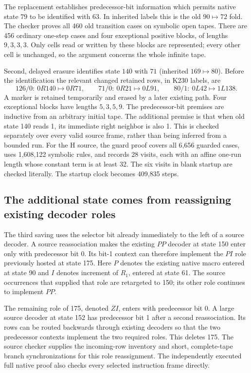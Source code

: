 The replacement establishes predecessor-bit information which permits native
state $79$ to be identified with $63$.  In inherited labels this is the old
$90\mapsto72$ fold.  The checker proves all 460 old transition cases on symbolic
open tapes.  There are 456 ordinary one-step cases and four exceptional positive
blocks, of lengths $9,3,3,3$.  Only cells read or written by these blocks are
represented; every other cell is unchanged, so the argument concerns the whole
infinite tape.

Second, delayed erasure identifies state $140$ with $71$ (inherited
$169\mapsto80$).  Before the identification the relevant changed retained rows,
in K230 labels, are
\[
126/0:\ 0R140\longmapsto0R71,\qquad
71/0:\ 0R21\longmapsto0L91,\qquad
80/1:\ 0L42\longmapsto1L138.
\]
A marker is retained temporarily and erased by a later existing path.  Four
exceptional blocks have lengths $5,3,5,9$.  The predecessor-bit premises are
inductive from an arbitrary initial tape.  The additional premise is that when
old state 140 reads 1, its immediate right neighbor is also 1.  This is checked
separately over every valid source frame, rather than being inferred from a
bounded run.  For the H source, the guard proof covers all 6,656 guarded cases,
uses 1,608,122 symbolic rules, and records 28 visits, each with an affine one-run
length whose constant term is at least 32.  The six visits in blank startup are
checked literally.  The startup clock becomes 409,835 steps.

\subsection{The additional state comes from reassigning existing decoder roles}

The third saving uses the selector bit already immediately to the left of a
source decoder.  A source reassociation makes the existing $PP$ decoder at
state 150 enter only with predecessor bit 0.  Its bit-1 context can therefore
implement the $PI$ role previously hosted at state 175.  Here $P$ denotes the
existing native macro entered at state 90 and $I$ denotes increment of $R_1$,
entered at state 61.  The source occurrences that supplied that role are
retargeted to 150; its other role continues to implement $PP$.

The remaining role of 175, denoted $ZI$, enters with predecessor bit 0.  A large
source decoder at state 152 has predecessor bit 1 after a second reassociation.
Its rows can be routed backwards through existing decoders so that the two
predecessor contexts implement the two required roles.  This deletes 175.  The
source checker supplies the incoming-row inventory and short, complete-tape
branch synchronizations for this role reassignment.  The independently executed
full native proof also checks every selected instruction frame directly.

